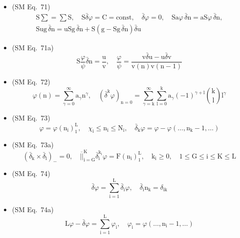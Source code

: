 \documentclass[
    12pt,              %
    a4paper,           %
    headings=normal,   %
    twoside=true,      %
    BCOR=8mm,          %
]{scrbook}
\begin{document}
\begin{itemize}[label={},leftmargin=0pt]
    \item (SM Eq.\ 71) 
    \[
    \begin{gathered}
    \mathrm{S}\sum = \sum\mathrm{S}, \quad \mathrm{S}\bar{\delta}\varphi = \mathrm{C} = \mathrm{const}, \quad \bar{\delta}\varphi = 0, \quad \mathrm{S}\mathrm{a}\varphi\,\bar{\delta}\mathrm{n} = \mathrm{a}\mathrm{S}\varphi\,\bar{\delta}\mathrm{n}, \\
    \mathrm{S}\mathrm{ug}\,\bar{\delta}\mathrm{n} = \mathrm{u}\mathrm{S}\mathrm{g}\,\bar{\delta}\mathrm{n} + \mathrm{S}(\mathrm{g} - \mathrm{S}\mathrm{g}\,\bar{\delta}\mathrm{n})\bar{\delta}\mathrm{u}
    \end{gathered}
    \]

    \item (SM Eq.\ 71a) 
    \[
    \mathrm{S}\frac{\varphi}{\psi}\bar{\delta}\mathrm{n} = \frac{\mathrm{u}}{\mathrm{v}}, \quad \frac{\varphi}{\psi} = \frac{\mathrm{v}\bar{\delta}\mathrm{u} - \mathrm{u}\bar{\delta}\mathrm{v}}{\mathrm{v}(\mathrm{n})\mathrm{v}(\mathrm{n}-1)}
    \]

    \item (SM Eq.\ 72) 
    \[
    \varphi(\mathrm{n}) = \sum_{\gamma=0}^\infty \mathrm{a}_\gamma \mathrm{n}^\gamma, \quad (\bar{\delta}^\mathrm{k} \varphi)_{\mathrm{n}=0} = \sum_{\gamma=\mathrm{k}}^\infty \sum_{\mathrm{l}=0}^\mathrm{k} \mathrm{a}_\gamma (-1)^{\gamma+\mathrm{l}} \binom{\mathrm{k}}{\mathrm{l}} \mathrm{l}^\gamma
    \]

    \item (SM Eq.\ 73) 
    \[
    \varphi = \varphi(\mathrm{n_i})_1^\mathrm{L}, \quad \chi_\mathrm{i} \le \mathrm{n_i} \le \mathrm{N_i}, \quad \bar{\delta}_\mathrm{k} \varphi = \varphi - \varphi(\dots, \mathrm{n_k} - 1, \dots)
    \]

    \item (SM Eq.\ 73a) 
    \[
    (\bar{\delta}_\mathrm{k} \times \bar{\delta}_\mathrm{l})_- = 0, \quad \overline{||}_{\mathrm{i}=\mathrm{G}}^{\mathrm{K}} \bar{\delta}_\mathrm{i}^{\mathrm{k_i}} \varphi = \mathrm{F}(\mathrm{n_i})_1^\mathrm{L}, \quad \mathrm{k_i} \ge 0, \quad 1 \le \mathrm{G} \le \mathrm{i} \le \mathrm{K} \le \mathrm{L}
    \]

    \item (SM Eq.\ 74) 
    \[
    \bar{\delta}\varphi = \sum_{\mathrm{i}=1}^\mathrm{L} \bar{\delta}_\mathrm{i} \varphi, \quad \bar{\delta}_\mathrm{i} \mathrm{n_k} = \delta_{\mathrm{ik}}
    \]

    \item (SM Eq.\ 74a) 
    \[
    \mathrm{L}\varphi - \bar{\delta}\varphi = \sum_{\mathrm{i}=1}^\mathrm{L} \varphi_\mathrm{i}, \quad \varphi_\mathrm{i} = \varphi(\dots, \mathrm{n_i} - 1, \dots)
    \]


\end{itemize}
\end{document}
